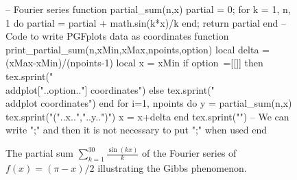 \begin{figure}
\begin{luacode*}
-- Fourier series
function partial_sum(n,x)
    partial = 0;
    for k = 1, n, 1 do 
        partial = partial + math.sin(k*x)/k 
    end;
    return partial
end
-- Code to write PGFplots data as coordinates
function print_partial_sum(n,xMin,xMax,npoints,option)
    local delta = (xMax-xMin)/(npoints-1)
    local x = xMin
    if option~=[[]] then
        tex.sprint("\\addplot["..option.."] coordinates{")
    else
        tex.sprint("\\addplot coordinates{")
    end
    for i=1, npoints do
        y = partial_sum(n,x)
        tex.sprint("("..x..","..y..")")
        x = x+delta
    end
    tex.sprint("}") -- We can write "};" and then it is not necessary to put ";" when used
end
\end{luacode*}
\newcommand\addLUADEDplot[5][]{\directlua{print_partial_sum(#2,#3,#4,#5,[[#1]])}}
\centering
\pgfplotsset{width=15cm, height=7cm}  
\caption{The partial sum $\sum_{k=1}^{30} \frac{\sin(kx)}{k}$ of the Fourier series  of $f(x)=(\pi-x)/2$ illustrating the Gibbs phenomenon.}\label{fig:Gibbs}
\end{figure}

